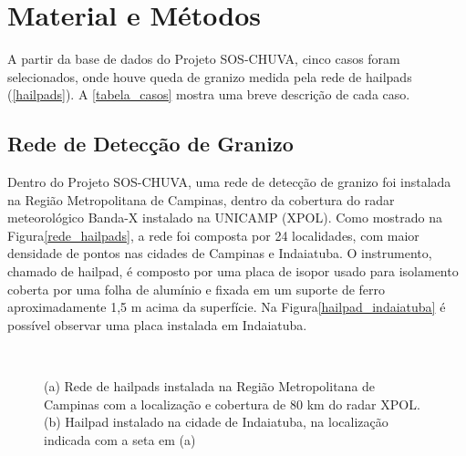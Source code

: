 \chapter{Material e Métodos}\label{database}

A partir da base de dados do Projeto SOS-CHUVA, cinco casos foram selecionados, onde houve queda de granizo medida pela rede de hailpads (\autoref{hailpads}). A \autoref{tabela_casos} mostra uma breve descrição de cada caso.



\section{Rede de Detecção de Granizo}\label{hailpads}

Dentro do Projeto SOS-CHUVA, uma rede de detecção de granizo foi instalada na Região Metropolitana de Campinas, dentro da cobertura do radar meteorológico Banda-X instalado na UNICAMP (XPOL). Como mostrado na Figura\autoref{rede_hailpads}, a rede foi composta por 24 localidades, com maior densidade de pontos nas cidades de Campinas e Indaiatuba. O instrumento, chamado de hailpad, é composto por uma placa de isopor usado para isolamento coberta por uma folha de alumínio e fixada em um suporte de ferro aproximadamente 1,5 m acima da superfície. Na Figura\autoref{hailpad_indaiatuba} é possível observar uma placa instalada em Indaiatuba.

\begin{figure}[htb]
	\begin{center}
		\caption{(a) Rede de hailpads instalada na Região Metropolitana de Campinas com a localização e cobertura de 80 km do radar XPOL. (b) Hailpad instalado na cidade de Indaiatuba, na localização indicada com a seta em (a)} 
		\label{overview_hailpads}
		\ \
		\\
	\end{center}
\end{figure}


